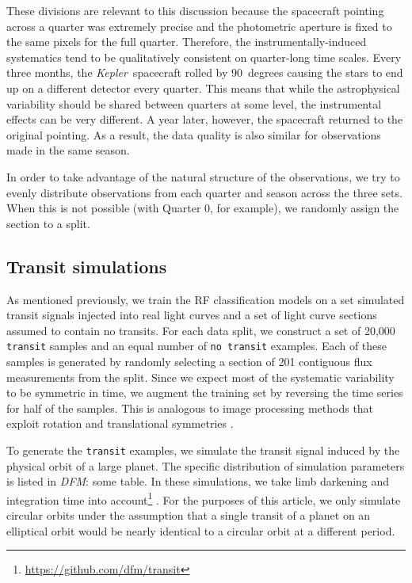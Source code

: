 \documentclass[12pt,preprint]{aastex}
\newcommand{\project}[1]{\textsl{#1}}
\newcommand{\kepler}{\project{Kepler}}
\newcommand{\paper}{article}
\newcommand{\todo}[3]{{\color{#2}\emph{#1}: #3}}
\newcommand{\dfmtodo}[1]{\todo{DFM}{red}{#1}}
\begin{document}
These divisions are relevant to this discussion because the spacecraft
pointing across a quarter was extremely precise and the photometric aperture
is fixed to the same pixels for the full quarter.
Therefore, the instrumentally-induced systematics tend to be qualitatively
consistent on quarter-long time scales.
Every three months, the \kepler\ spacecraft rolled by 90~degrees causing the
stars to end up on a different detector every quarter.
This means that while the astrophysical variability should be shared between
quarters at some level, the instrumental effects can be very different.
A year later, however, the spacecraft returned to the original pointing.
As a result, the data quality is also similar for observations made in the
same season.

In order to take advantage of the natural structure of the observations, we
try to evenly distribute observations from each quarter and season across the
three sets.
When this is not possible (with Quarter 0, for example), we randomly assign
the section to a split.


\subsection{Transit simulations}

As mentioned previously, we train the RF classification models on a set
simulated transit signals injected into real light curves and a set of light
curve sections assumed to contain no transits.
For each data split, we construct a set of 20,000 \texttt{transit} samples and
an equal number of \texttt{no transit} examples.
Each of these samples is generated by randomly selecting a section of 201
contiguous flux measurements from the split.
Since we expect most of the systematic variability to be symmetric in time, we
augment the training set by reversing the time series for half of the samples.
This is analogous to image processing methods that exploit rotation and
translational symmetries \citep[for an example from astronomy
see][]{Dieleman:2015}.

To generate the \texttt{transit} examples, we simulate the transit signal
induced by the physical orbit of a large planet.
The specific distribution of simulation parameters is listed in \dfmtodo{some
table}.
In these simulations, we take limb darkening and integration time into
account\footnote{\url{https://github.com/dfm/transit}}
\citep{Mandel:2002, Kipping:2010}.
For the purposes of this \paper, we only simulate circular orbits under the
assumption that a single transit of a planet on an elliptical orbit would be
nearly identical to a circular orbit at a different period.
\end{document}

